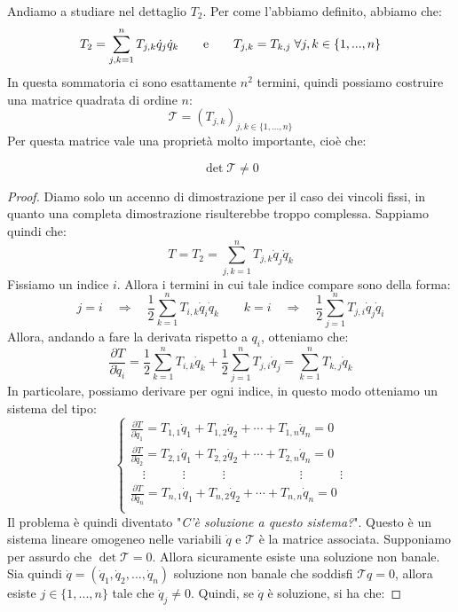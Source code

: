 \documentclass[11pt,a4paper,twoside]{article}
\theoremstyle{definition}
\begin{document}
Andiamo a studiare nel dettaglio $T_2$. Per come l'abbiamo definito, abbiamo che:
\[ T_2 = \sum_{j,k=1}^n T_{j,k} \dot q_j \dot q_k \qquad \text e \qquad T_{j,k} = T_{k,j}\; \forall j,k \in \{1,...,n\} \]
In questa sommatoria ci sono esattamente $n^2$ termini, quindi possiamo costruire una matrice quadrata di ordine $n$:
\[ \mathscr T = (T_{j,k})_{j,k \in \{1,...,n\}} \]
Per questa matrice vale una proprietà molto importante, cioè che:
\begin{prop}{}{}\label{Tau}
	\[ \det \mathscr T \neq 0 \]
\end{prop}
\begin{proof}
	Diamo solo un accenno di dimostrazione per il caso dei vincoli fissi, in quanto una completa dimostrazione risulterebbe troppo complessa. Sappiamo quindi che:
	\[ T = T_2 = \sum_{j,k=1}^n T_{j,k} \dot q_j \dot q_k \]
	Fissiamo un indice $i$. Allora i termini in cui tale indice compare sono della forma:
	\[ j = i \quad \Rightarrow \quad \frac 12 \sum_{k=1}^n T_{i,k} \dot q_i \dot q_k \qquad k=i \quad \Rightarrow \quad \frac 12 \sum_{j=1}^n T_{j,i} \dot q_j \dot q_i \]
	Allora, andando a fare la derivata rispetto a $q_i$, otteniamo che:
	\[ \frac{\partial T}{\partial \dot q_i} = \frac 12 \sum_{k=1}^n T_{i,k}\dot q_k + \frac 12 \sum_{j=1}^n T_{j,i} \dot q_j = \sum_{k =1}^n T_{k,j} \dot q_k\]
	In particolare, possiamo derivare per ogni indice, in questo modo otteniamo un sistema del tipo:
	\[\begin{cases}
		\frac{\partial T}{\partial \dot q_1} = T_{1,1} \dot q_1 + T_{1,2} \dot q_2 + \cdots + T_{1,n} \dot q_n = 0\\
		\frac{\partial T}{\partial \dot q_2} = T_{2,1} \dot q_1 + T_{2,2} \dot q_2 + \cdots + T_{2,n} \dot q_n = 0\\
		\quad \vdots \quad \qquad \vdots \qquad \quad \vdots \qquad \qquad \qquad \vdots \qquad \quad \vdots\\
		\frac{\partial T}{\partial \dot q_n} = T_{n,1} \dot q_1 + T_{n,2} \dot q_2 + \cdots + T_{n,n} \dot q_n = 0\\
	\end{cases}\]
	Il problema è quindi diventato "\textit{C'è soluzione a questo sistema?}". Questo è un sistema lineare omogeneo nelle variabili $\dot q$ e $\mathscr T$ è la matrice associata. Supponiamo per assurdo che $\det \mathscr T = 0$. Allora sicuramente esiste una soluzione non banale. Sia quindi $\dot q = (\dot q_1, \dot q_2,...,\dot q_n)$ soluzione non banale che soddisfi $\mathscr T q = 0$, allora esiste $j \in \{1,...,n\}$ tale che $\dot q_j \neq 0$. Quindi, se $\dot q$ è soluzione, si ha che:

\end{proof}
\end{document}
